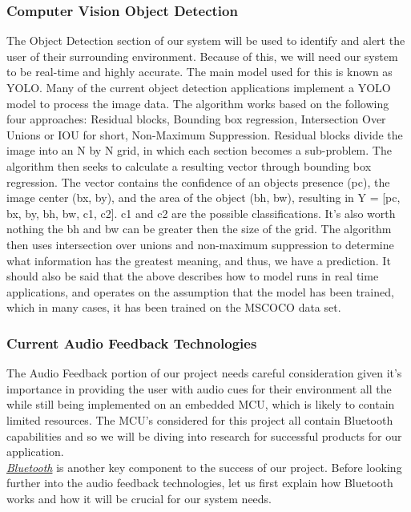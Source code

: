 \subsubsection{Computer Vision Object Detection}
\noindent The Object Detection section of our system will be used to identify and alert the user of their surrounding environment. Because of this, we will need our system to be real-time and highly accurate. The main model used for this is known as YOLO. Many of the current object detection applications implement a YOLO model to process the image data. The algorithm works based on the following four approaches: Residual blocks, Bounding box regression, Intersection Over Unions or IOU for short, Non-Maximum Suppression. Residual blocks divide the image into an N by N grid, in which each section becomes a sub-problem. The algorithm then seeks to calculate a resulting vector through bounding box regression. The vector contains the confidence of an objects presence (pc), the image center (bx, by), and the area of the object (bh, bw), resulting in Y = [pc, bx, by, bh, bw, c1, c2]. c1 and c2 are the possible classifications. It's also worth nothing the bh and bw can be greater then the size of the grid. The algorithm then uses intersection over unions and non-maximum suppression to determine what information has the greatest meaning, and thus, we have a prediction. It should also be said that the above describes how to model runs in real time applications, and operates on the assumption that the model has been trained, which in many cases, it has been trained on the MSCOCO data set. \\

\subsubsection{Current Audio Feedback Technologies}
\noindent The Audio Feedback portion of our project needs careful consideration given it's importance in providing the user with audio cues for their environment all the while still being implemented on an embedded MCU, which is likely to contain limited resources. The MCU's considered for this project all contain Bluetooth capabilities and so we will be diving into research for successful products for our application. \\

\noindent \underline{\textit{Bluetooth}} \cite{bluetooth} is another key component to the success of our project. Before looking further into the audio feedback technologies, let us first explain how Bluetooth works and how it will be crucial for our system needs. \\

